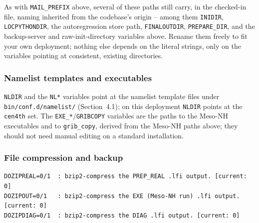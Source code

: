 As with \texttt{MAIL\_PREFIX} above, several of these paths still carry, in the checked-in file, naming
inherited from the codebase's origin -- among them \texttt{INIDIR}, \texttt{LOCPYTHONDIR}, the
autoregression store path, \texttt{FINALOUTDIR}, \texttt{PREPARE\_DIR}, and the backup-server and
raw-init-directory variables above. Rename them freely to fit your own deployment; nothing else depends
on the literal strings, only on the variables pointing at consistent, existing directories.

\subsubsection{Namelist templates and executables}
\texttt{NLDIR} and the \texttt{NL*} variables point at the namelist template files under
\texttt{bin/conf.d/namelist/} (Section~4.1); on this deployment \texttt{NLDIR} points at the
\texttt{cen4th} set. The \texttt{EXE\_*}/\texttt{GRIBCOPY} variables are the paths to the Meso-NH
executables and to \texttt{grib\_copy}, derived from the Meso-NH paths above; they should not need
manual editing on a standard installation.

\subsubsection{File compression and backup}
\begin{lstlisting}
DOZIPREAL=0/1  : bzip2-compress the PREP_REAL .lfi output. [current: 0]
DOZIPOUT=0/1   : bzip2-compress the EXE (Meso-NH run) .lfi output. [current: 0]
DOZIPDIAG=0/1  : bzip2-compress the DIAG .lfi output. [current: 0]
\end{lstlisting}
